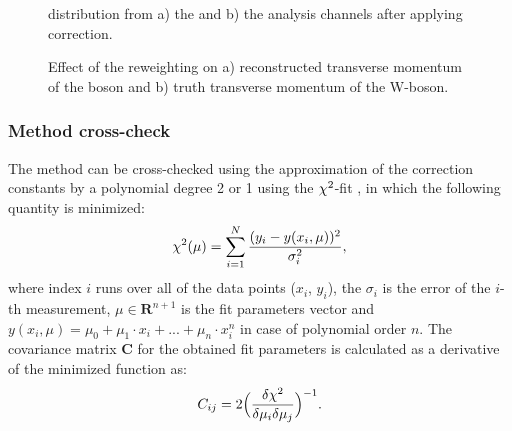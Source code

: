 \begin{figure}[!tbp]
\begin{minipage}[h]{0.5\linewidth}
\end{minipage}
\hfill
\begin{minipage}[h]{0.5\linewidth}
\end{minipage}
\caption{\sumet distribution from a) the \wenu and b) the \wmunu analysis channels after applying \sumet correction. }
\label{HadrRecoil:CorrSumet}
\end{figure}

\begin{figure}[!tbp]
\begin{minipage}[h]{0.49\linewidth}
\end{minipage}
\hfill
\begin{minipage}[h]{0.49\linewidth}
\end{minipage}
\caption{Effect of the \sumet reweighting on a) reconstructed transverse momentum of the boson and b) truth transverse momentum of the W-boson.}
\label{HadrRecoil:PtSpectrum}
\end{figure}

\subsubsection{Method cross-check}

The method can be cross-checked using the approximation of the correction constants by a polynomial degree 2 or 1 using the $\chi^2$-fit \cite{Watson1967}, in which the following quantity is minimized:
\begin{equation}
\chi^2 (\mu) = \sum_{i=1}^{N} \frac{(y_i - y(x_i , \mu ))^2}{\sigma_i^2},
\end{equation}
where  index $i$ runs over all of the data points ($x_i$, $y_i$), the $\sigma_i$ is the error of the $i$-th measurement, $\mu\in \boldsymbol{R}^{n+1}$ is the fit parameters vector and $y(x_i, \mu)=\mu_0+\mu_1\cdot x_i +... + \mu_n \cdot x_i^n$ in case of polynomial order $n$.
The covariance matrix  $\mathbf{C}$ for the obtained fit parameters is calculated as a derivative of the minimized \chiD function as:
\begin{equation}
C_{ij}=2\Big(\frac{\delta\chi^2}{\delta \mu_i \delta \mu_j} \Big)^{-1}.
\end{equation}

